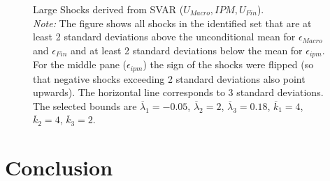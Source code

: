\documentclass[a4paper,11pt,listof=nochaptergap,oneside,pointednumbers,bibtotoc,bigheadings,liststotoc]{scrbook}
\theoremstyle{mysatz}
\theoremstyle{mydefinition}
\theoremstyle{mybemerkung}
\begin{document}
\blindtext

\begin{figure}[!h]
   \centering
   \setlength\fboxsep{0pt}
   \setlength\fboxrule{0pt}
      \caption[Large Shocks derived from SVAR ($U_{Macro}, IPM, U_{Fin}$).]{Large Shocks derived from SVAR ($U_{Macro}, IPM, U_{Fin}$).\\
      \textit{Note:}  The figure shows all shocks in the identified set that are at least 2 standard deviations above the unconditional mean for $\epsilon_{Macro}$ and $\epsilon_{Fin}$ and at least 2 standard deviations below the mean for $\epsilon_{ipm}$. For the middle pane ($\epsilon_{ipm}$) the sign of the shocks were flipped (so that negative shocks exceeding 2 standard deviations also point upwards). The horizontal line corresponds to 3 standard deviations. The selected bounds are $\overline{\lambda}_1 = -0.05$, $\overline{\lambda}_2 = 2$, $\overline{\lambda}_3 = 0.18$, $\overline{k}_1 = 4$, $\overline{k}_2 = 4$, $\overline{k}_3 = 2$.}   \label{fig:ludvigsonetal_timeseries_e_largeshocks}
\end{figure}

\chapter{Conclusion}
\label{Conclusion}
\end{document}
